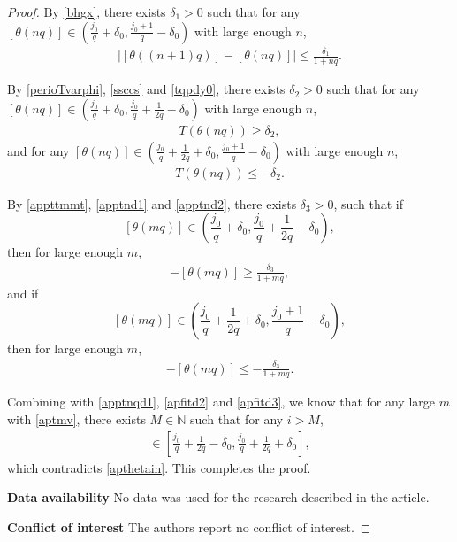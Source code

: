 \documentclass[12pt]{amsart}
\newcommand{\abs}[1]{\left\lvert #1 \right\rvert}
\theoremstyle{plain}
\theoremstyle{definition}
\begin{document}
\begin{proof}
By \eqref{bhgx}, there exists $\delta_1>0$ such that for any  $[\theta(nq)]\in \left(\frac{j_0}{q}+\delta_0,\frac{j_0+1}{q}-\delta_0\right)$ with large enough $n$,
\begin{align}
	\abs{ [\theta((n+1)q)]-[\theta(nq)]}\leq \frac{\delta_1}{1+nq}.\label{apptnqd1}
\end{align}

By \eqref{perioTvarphi}, \eqref{ssccs} and \eqref{tqpdy0}, there exists $\delta_2>0$ such that for any $[\theta(nq)]\in \left(\frac{j_0}{q}+\delta_0,\frac{j_0}{q}+\frac{1}{2q}-\delta_0\right)$ with large enough $n$,
\begin{align}
	T(\theta(nq))\geq \delta_2,\label{apptnd1}
\end{align}
and for any $[\theta(nq)]\in\left(\frac{j_0}{q}+\frac{1}{2q}+\delta_0,\frac{j_0+1}{q}-\delta_0\right)$ with large enough $n$,
\begin{align}
	T(\theta(nq))\leq-\delta_2.\label{apptnd2}
\end{align}

By 
\eqref{appttmmt}, \eqref{apptnd1} and \eqref{apptnd2}, there exists $\delta_3>0$, such that if 
$$[\theta(mq)]\in \left(\frac{j_0}{q}+\delta_0,\frac{j_0}{q}+\frac{1}{2q}-\delta_0\right),$$ 
then for large enough $m$,
\begin{align}
	[\theta((m+1)q)]-[\theta(mq)]\geq \frac{\delta_3}{1+mq},\label{apfitd2}
\end{align}
and if
$$[\theta(mq)]\in \left(\frac{j_0}{q}+\frac{1}{2q}+\delta_0,\frac{j_0+1}{q}-\delta_0\right),$$
then for large enough $m$,
\begin{align}
	[\theta((m+1)q)]-[\theta(mq)]\leq-\frac{\delta_3}{1+mq}.\label{apfitd3}
\end{align}

Combining with \eqref{apptnqd1}, \eqref{apfitd2} and \eqref{apfitd3}, we know that for any large $m$ with \eqref{aptmv}, there exists $M\in\mathbb{N}$ such that for any $i>M$,
\begin{align}
	[\theta((m+i)q)]\in \left[\frac{j_0}{q}+\frac{1}{2q}-\delta_0,\frac{j_0}{q}+\frac{1}{2q}+\delta_0\right],\nonumber
\end{align}
which contradicts \eqref{apthetain}. This completes the proof.




\vspace{2mm}\noindent \textbf{Data availability}
No data was used for the research described in the article.

\vspace{2mm}\noindent \textbf{Conflict of interest} The authors report no conflict of interest.



\end{proof}
\end{document}
